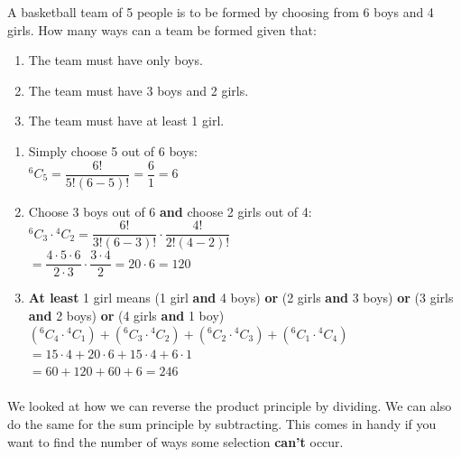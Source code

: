 \documentclass[12pt, a4paper, titlepage, twoside]{article}
\newcounter{excount}[subsection]
\begin{document}
	\begin{ex}
		A basketball team of 5 people is to be formed by choosing from 6 boys and 4 girls. How many ways can a team be formed given 
		that:
		
		\begin{enumerate}[label=\textbf{(\alph*)}]
			\item The team must have only boys.
			\item The team must have 3 boys and 2 girls.
			\item The team must have at least 1 girl.
		\end{enumerate}
		
		\tcbline
		
		\begin{enumerate}[label=\textbf{(\alph*)}]
			\item Simply choose 5 out of 6 boys: \\
			${^6C_5} = \dfrac{6!}{5!(6-5)!} = \dfrac{6}{1} = 6$\\
			
			\item Choose 3 boys out of 6 \textbf{and} choose 2 girls out of 4:\\
			${^6C_3} \cdot {^4C_2} = \dfrac{6!}{3!(6-3)!} \cdot \dfrac{4!}{2!(4-2)!}$\\ 
			$= \dfrac{4 \cdot 5 \cdot 6}{2 \cdot 3} \cdot \dfrac{3 \cdot 4}{2} = 20 \cdot 6 = 120$\\
			
			\item \textbf{At least} 1 girl means (1 girl \textbf{and} 4 boys) \textbf{or} (2 girls \textbf{and} 3 boys) \textbf{or} 
			(3 girls \textbf{and} 2 boys) \textbf{or} (4 girls \textbf{and} 1 boy)\\
			
			$({^6C_4} \cdot {^4C_1}) + ({^6C_3} \cdot {^4C_2}) + ({^6C_2} \cdot {^4C_3}) + ({^6C_1} \cdot {^4C_4})$\\
			$= 15 \cdot 4 + 20 \cdot 6 + 15 \cdot 4 + 6 \cdot 1$\\
			$= 60 + 120 + 60 + 6 = 246$
		\end{enumerate}
		
	\end{ex}
	
	\paragraph{}
	We looked at how we can reverse the product principle by dividing. We can also do the same for the sum principle by
	subtracting. This comes in handy if you want to find the number of ways some selection \textbf{can't} occur. 
	
\end{document}
